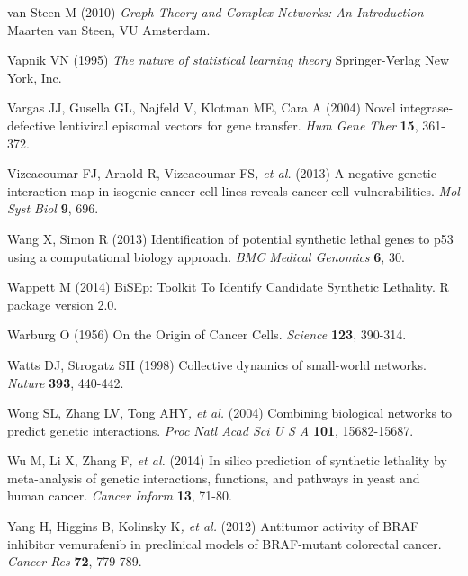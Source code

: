 \hypertarget{ENREF105}{}van Steen M (2010) \textit{Graph Theory and
Complex Networks: An Introduction} Maarten van Steen, VU Amsterdam.



\hypertarget{ENREF106}{}Vapnik VN (1995) \textit{The nature of
statistical learning theory} Springer-Verlag New York, Inc.



Vargas JJ, Gusella GL, Najfeld V, Klotman ME, Cara A (2004) Novel
integrase-defective lentiviral episomal vectors for gene transfer.
\textit{Hum Gene Ther} \textbf{15}, 361-372.



\hypertarget{ENREF108}{}Vizeacoumar FJ, Arnold R, Vizeacoumar
FS\textit{, et al.} (2013) A negative genetic interaction map in
isogenic cancer cell lines reveals cancer cell vulnerabilities.
\textit{Mol Syst Biol} \textbf{9}, 696.



\hypertarget{ENREF109}{}Wang X, Simon R (2013) Identification of
potential synthetic lethal genes to p53 using a computational biology
approach. \textit{BMC Medical Genomics} \textbf{6}, 30.



\hypertarget{ENREF110}{}Wappett M (2014) BiSEp: Toolkit To Identify
Candidate Synthetic Lethality. R package version 2.0.



Warburg O (1956) On the Origin of Cancer Cells. \textit{Science}
\textbf{123}, 390-314.



\hypertarget{ENREF112}{}Watts DJ, Strogatz SH (1998) Collective dynamics
of {\textquotesingle}small-world{\textquotesingle} networks.
\textit{Nature} \textbf{393}, 440-442.



\hypertarget{ENREF113}{}Wong SL, Zhang LV, Tong AHY\textit{, et al.}
(2004) Combining biological networks to predict genetic interactions.
\textit{Proc Natl Acad Sci U S A} \textbf{101}, 15682-15687.



\hypertarget{ENREF114}{}Wu M, Li X, Zhang F\textit{, et al.} (2014) In
silico prediction of synthetic lethality by meta-analysis of genetic
interactions, functions, and pathways in yeast and human cancer.
\textit{Cancer Inform} \textbf{13}, 71-80.



\hypertarget{ENREF115}{}Yang H, Higgins B, Kolinsky K\textit{, et al.}
(2012) Antitumor activity of BRAF inhibitor vemurafenib in preclinical
models of BRAF-mutant colorectal cancer. \textit{Cancer Res}
\textbf{72}, 779-789.



